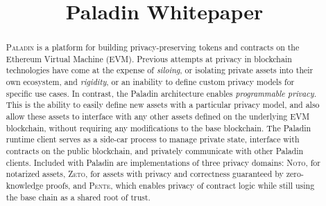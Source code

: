 \documentclass[conference,compsoc,onecolumn,11pt]{IEEEtran}
\date{}
\author{}
\begin{document}
\title{Paladin Whitepaper}

\maketitle


\begin{abstract}

\textsc{Paladin} is a platform for building privacy-preserving tokens and contracts on the Ethereum Virtual Machine (EVM). Previous attempts at privacy in blockchain technologies have come at the expense of \textit{siloing}, or isolating private assets into their own ecosystem, and \textit{rigidity}, or an inability to define custom privacy models for specific use cases. In contrast, the Paladin architecture enables \textit{programmable privacy}. This is the ability to easily define new assets with a particular privacy model, and also allow these assets to interface with any other assets defined on the underlying EVM blockchain, without requiring any modifications to the base blockchain. The Paladin runtime client serves as a side-car process to manage private state, interface with contracts on the public blockchain, and privately communicate with other Paladin clients. Included with Paladin are implementations of three privacy domains: \textsc{Noto}, for notarized assets, \textsc{Zeto}, for assets with privacy and correctness guaranteed by zero-knowledge proofs, and \textsc{Pente}, which enables privacy of contract logic while still using the base chain as a shared root of trust.

\end{abstract}














\appendices
% 
\end{document}
